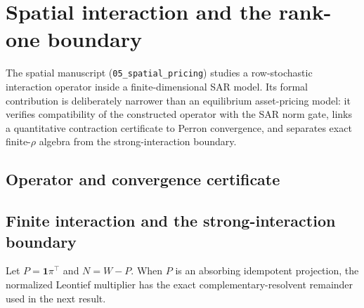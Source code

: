 \chapter{Spatial interaction and the rank-one boundary}
\label{chap:spatial}

The spatial manuscript (\texttt{05\_spatial\_pricing}) studies a
row-stochastic interaction operator inside a finite-dimensional SAR model.  Its
formal contribution is deliberately narrower than an equilibrium asset-pricing
model: it verifies compatibility of the constructed operator with the SAR norm
gate, links a quantitative contraction certificate to Perron convergence, and
separates exact finite-\(\rho\) algebra from the strong-interaction boundary.

\section{Operator and convergence certificate}






\section{Finite interaction and the strong-interaction boundary}

Let \(P=\mathbf 1\pi^\top\) and \(N=W-P\).  When \(P\) is an absorbing
idempotent projection, the normalized Leontief multiplier has the exact
complementary-resolvent remainder used in the next result.



